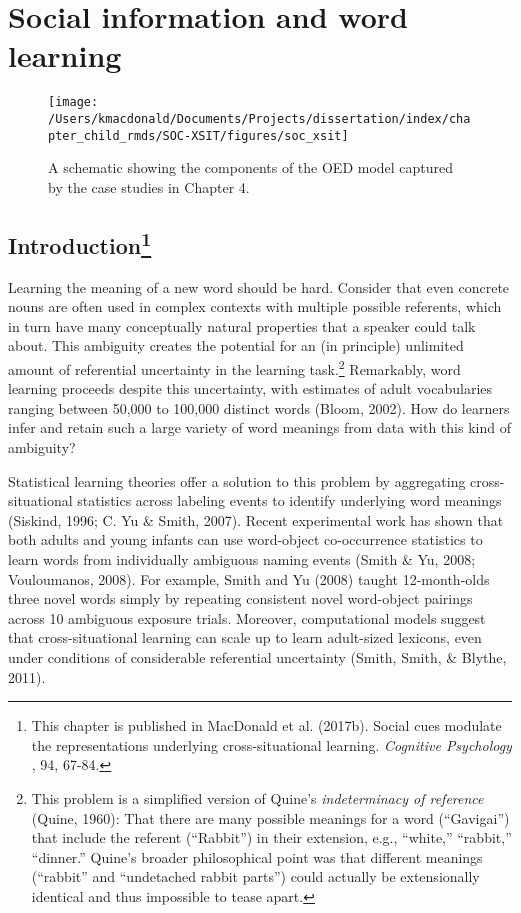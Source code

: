\documentclass[oneside]{report}
\begin{document}
\hypertarget{soc-xsit}{%
\chapter{Social information and word learning}\label{soc-xsit}}
\begin{figure}[t]

{\centering \texttt{[image: /Users/kmacdonald/Documents/Projects/dissertation/index/chapter\_child\_rmds/SOC-XSIT/figures/soc\_xsit]} 

}

\caption{A schematic showing the components of the OED model captured by the case studies in Chapter 4.}\label{fig:schematic-soc-xsit}
\end{figure}
\hypertarget{introduction-3}{%
\section[Introduction]{\texorpdfstring{Introduction\footnote{This
  chapter is published in MacDonald et al. (2017b). Social cues modulate
  the representations underlying cross-situational learning.
  \emph{Cognitive Psychology }, 94, 67-84.}}{Introduction}}\label{introduction-3}}

Learning the meaning of a new word should be hard. Consider that even
concrete nouns are often used in complex contexts with multiple possible
referents, which in turn have many conceptually natural properties that
a speaker could talk about. This ambiguity creates the potential for an
(in principle) unlimited amount of referential uncertainty in the
learning task.\footnote{This problem is a simplified version of Quine's
  \textit{indeterminacy of reference} (Quine, 1960): That there are many
  possible meanings for a word (``Gavigai'') that include the referent
  (``Rabbit'') in their extension, e.g., ``white,'' ``rabbit,''
  ``dinner.'' Quine's broader philosophical point was that different
  meanings (``rabbit'' and ``undetached rabbit parts'') could actually
  be extensionally identical and thus impossible to tease apart.}
Remarkably, word learning proceeds despite this uncertainty, with
estimates of adult vocabularies ranging between 50,000 to 100,000
distinct words (Bloom, 2002). How do learners infer and retain such a
large variety of word meanings from data with this kind of ambiguity?

Statistical learning theories offer a solution to this problem by
aggregating cross-situational statistics across labeling events to
identify underlying word meanings (Siskind, 1996; C. Yu \& Smith, 2007).
Recent experimental work has shown that both adults and young infants
can use word-object co-occurrence statistics to learn words from
individually ambiguous naming events (Smith \& Yu, 2008; Vouloumanos,
2008). For example, Smith and Yu (2008) taught 12-month-olds three novel
words simply by repeating consistent novel word-object pairings across
10 ambiguous exposure trials. Moreover, computational models suggest
that cross-situational learning can scale up to learn adult-sized
lexicons, even under conditions of considerable referential uncertainty
(Smith, Smith, \& Blythe, 2011).
\end{document}
